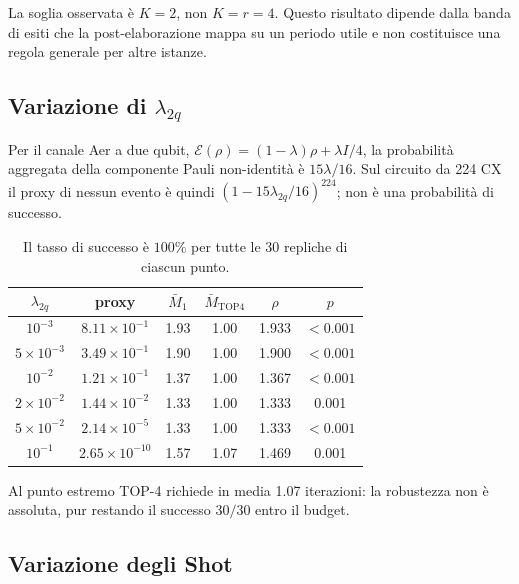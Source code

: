 \begin{onehalfspace}
La soglia osservata è $K=2$, non $K=r=4$. Questo risultato dipende
dalla banda di esiti che la post-elaborazione mappa su un periodo utile e
non costituisce una regola generale per altre istanze.

\subsection{Variazione di
\texorpdfstring{$\lambda_{2q}$}{lambda 2q}}
\label{subsec:sweep_eps}

Per il canale Aer a due qubit,
$\mathcal E(\rho)=(1-\lambda)\rho+\lambda I/4$, la probabilità
aggregata della componente Pauli non-identità è $15\lambda/16$. Sul
circuito da 224 CX il proxy di nessun evento è quindi
$(1-15\lambda_{2q}/16)^{224}$; non è una probabilità di successo.

\begin{table}[H]
\centering

\begin{tabular}{cccccc}
\toprule
$\lambda_{2q}$ & proxy & $\bar M_1$ & $\bar M_{\mathrm{TOP4}}$ & $\rho$ & $p$ \\
\midrule
$10^{-3}$ & $8.11\times10^{-1}$ & 1.93 & 1.00 & 1.933 & $<0.001$ \\
\addlinespace[0.3em]
$5\times10^{-3}$ & $3.49\times10^{-1}$ & 1.90 & 1.00 & 1.900 & $<0.001$ \\
\addlinespace[0.3em]
$10^{-2}$ & $1.21\times10^{-1}$ & 1.37 & 1.00 & 1.367 & $<0.001$ \\
\addlinespace[0.3em]
$2\times10^{-2}$ & $1.44\times10^{-2}$ & 1.33 & 1.00 & 1.333 & 0.001 \\
\addlinespace[0.3em]
$5\times10^{-2}$ & $2.14\times10^{-5}$ & 1.33 & 1.00 & 1.333 & $<0.001$ \\
\addlinespace[0.3em]
$10^{-1}$ & $2.65\times10^{-10}$ & 1.57 & 1.07 & 1.469 & 0.001 \\
\bottomrule
\end{tabular}
\caption[Sweep del parametro Aer $\lambda_{2q}$]{Il tasso di successo è
$100\%$ per tutte le 30 repliche di ciascun punto.}\label{tab:sweep_eps}\label{tab:sweep_eps2q}

\end{table}

Al punto estremo TOP-4 richiede in media 1.07 iterazioni: la robustezza
non è assoluta, pur restando il successo $30/30$ entro il budget.

\subsection{Variazione degli Shot}
\label{subsec:sweep_shots}


\end{onehalfspace}
